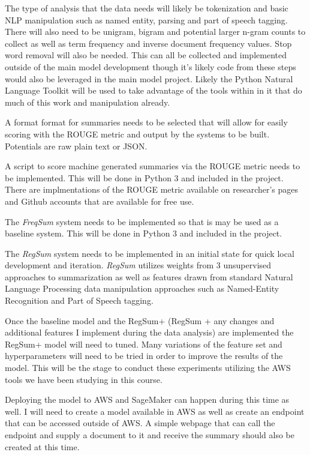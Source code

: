 \documentclass{article}
\begin{document}
The type of analysis that the data needs will likely be tokenization and basic
NLP manipulation such as named entity, parsing and part of speech tagging. There
will also need to be unigram, bigram and potential larger n-gram counts to
collect as well as term frequency and inverse document frequency values. Stop
word removal will also be needed. This can all be collected and implemented
outside of the main model development though it's likely code from these steps
would also be leveraged in the main model project. Likely the Python Natural
Language Toolkit will be used to take advantage of the tools within in it that
do much of this work and manipulation already.

A format format for summaries needs to be selected that will allow for easily
scoring with the ROUGE metric and output by the systems to be built. Potentials
are raw plain text or JSON\@.

A script to score machine generated summaries via the ROUGE metric needs to be
implemented. This will be done in Python 3 and included in the project.
There are implmentations of the ROUGE metric available on researcher's pages
and Github accounts that are available for free use.

The \emph{FreqSum} system needs to be implemented so that is may be used as
a baseline system. This will be done in Python 3 and included in the project.

The \emph{RegSum} system needs to be implemented in an initial state for quick local
development and iteration. \emph{RegSum} utilizes weights from 3 unsupervised
approaches to summarization as well as features drawn from standard Natural
Language Processing data manipulation approaches such as Named-Entity
Recognition and Part of Speech tagging.

Once the baseline model and the RegSum+ (RegSum + any changes and additional
features I implement during the data analysis) are implemented the RegSum+ model
will need to tuned. Many variations of the feature set and hyperparameters will
need to be tried in order to improve the results of the model. This will be the
stage to conduct these experiments utilizing the AWS tools we have been
studying in this course.

Deploying the model to AWS and SageMaker can happen during this time as well.
I will need to create a model available in AWS as well as create an endpoint
that can be accessed outside of AWS\@. A simple webpage that can call the endpoint
and supply a document to it and receive the summary should also be created at
this time.
\end{document}
